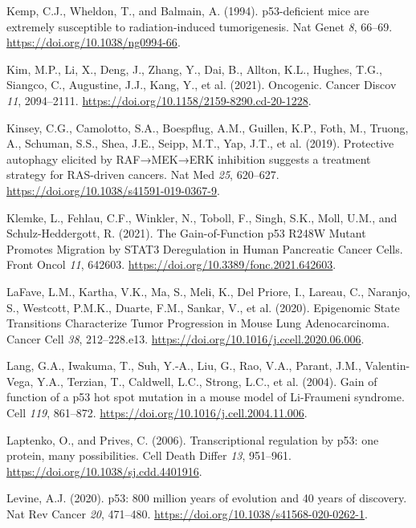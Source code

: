 \begin{CSLReferences}{0}{0}
\leavevmode{}%
Kemp, C.J., Wheldon, T., and Balmain, A. (1994). p53-deficient mice are extremely susceptible to radiation-induced tumorigenesis. Nat Genet \emph{8}, 66--69. \url{https://doi.org/10.1038/ng0994-66}.

\leavevmode{}%
Kim, M.P., Li, X., Deng, J., Zhang, Y., Dai, B., Allton, K.L., Hughes, T.G., Siangco, C., Augustine, J.J., Kang, Y., et al. (2021). Oncogenic. Cancer Discov \emph{11}, 2094--2111. \url{https://doi.org/10.1158/2159-8290.cd-20-1228}.

\leavevmode{}%
Kinsey, C.G., Camolotto, S.A., Boespflug, A.M., Guillen, K.P., Foth, M., Truong, A., Schuman, S.S., Shea, J.E., Seipp, M.T., Yap, J.T., et al. (2019). Protective autophagy elicited by RAF→MEK→ERK inhibition suggests a treatment strategy for RAS-driven cancers. Nat Med \emph{25}, 620--627. \url{https://doi.org/10.1038/s41591-019-0367-9}.

\leavevmode{}%
Klemke, L., Fehlau, C.F., Winkler, N., Toboll, F., Singh, S.K., Moll, U.M., and Schulz-Heddergott, R. (2021). The Gain-of-Function p53 R248W Mutant Promotes Migration by STAT3 Deregulation in Human Pancreatic Cancer Cells. Front Oncol \emph{11}, 642603. \url{https://doi.org/10.3389/fonc.2021.642603}.

\leavevmode{}%
LaFave, L.M., Kartha, V.K., Ma, S., Meli, K., Del Priore, I., Lareau, C., Naranjo, S., Westcott, P.M.K., Duarte, F.M., Sankar, V., et al. (2020). Epigenomic State Transitions Characterize Tumor Progression in Mouse Lung Adenocarcinoma. Cancer Cell \emph{38}, 212--228.e13. \url{https://doi.org/10.1016/j.ccell.2020.06.006}.

\leavevmode{}%
Lang, G.A., Iwakuma, T., Suh, Y.-A., Liu, G., Rao, V.A., Parant, J.M., Valentin-Vega, Y.A., Terzian, T., Caldwell, L.C., Strong, L.C., et al. (2004). Gain of function of a p53 hot spot mutation in a mouse model of Li-Fraumeni syndrome. Cell \emph{119}, 861--872. \url{https://doi.org/10.1016/j.cell.2004.11.006}.

\leavevmode{}%
Laptenko, O., and Prives, C. (2006). Transcriptional regulation by p53: one protein, many possibilities. Cell Death Differ \emph{13}, 951--961. \url{https://doi.org/10.1038/sj.cdd.4401916}.

\leavevmode{}%
Levine, A.J. (2020). p53: 800 million years of evolution and 40 years of discovery. Nat Rev Cancer \emph{20}, 471--480. \url{https://doi.org/10.1038/s41568-020-0262-1}.


\end{CSLReferences}

